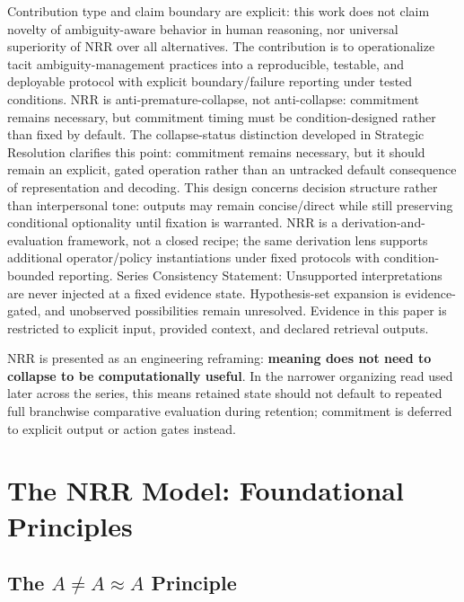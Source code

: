 \documentclass[11pt,a4paper]{article}
\newcommand{\AneqAapproxA}{A \neq A \approx A}
\begin{document}
Contribution type and claim boundary are explicit: this work does not claim novelty of ambiguity-aware behavior in human reasoning, nor universal superiority of NRR over all alternatives. The contribution is to operationalize tacit ambiguity-management practices into a reproducible, testable, and deployable protocol with explicit boundary/failure reporting under tested conditions.
NRR is anti-premature-collapse, not anti-collapse: commitment remains necessary, but commitment timing must be condition-designed rather than fixed by default.
The collapse-status distinction developed in Strategic Resolution clarifies this point: commitment remains necessary, but it should remain an explicit, gated operation rather than an untracked default consequence of representation and decoding.
This design concerns decision structure rather than interpersonal tone: outputs may remain concise/direct while still preserving conditional optionality until fixation is warranted.
NRR is a derivation-and-evaluation framework, not a closed recipe; the same derivation lens supports additional operator/policy instantiations under fixed protocols with condition-bounded reporting.
Series Consistency Statement: Unsupported interpretations are never injected at a fixed evidence state. Hypothesis-set expansion is evidence-gated, and unobserved possibilities remain unresolved. Evidence in this paper is restricted to explicit input, provided context, and declared retrieval outputs.

NRR is presented as an engineering reframing: \textbf{meaning does not need to collapse to be computationally useful}. In the narrower organizing read used later across the series, this means retained state should not default to repeated full branchwise comparative evaluation during retention; commitment is deferred to explicit output or action gates instead.

\section{The NRR Model: Foundational Principles}

\subsection{The $\AneqAapproxA$ Principle}
\end{document}
